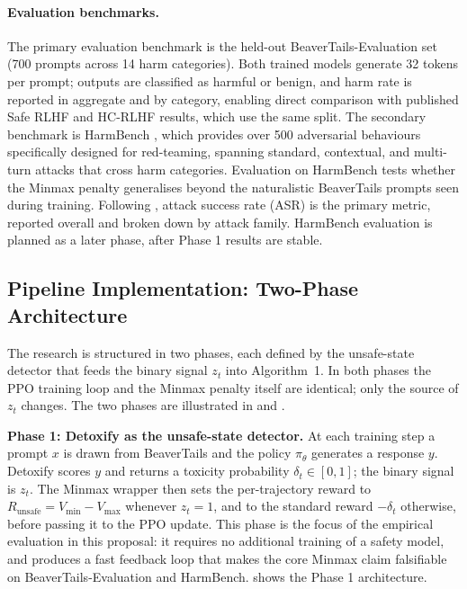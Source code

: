 \documentclass[a4paper,twoside,12pt]{report}
\newcommand{\runsafe}{R_{\text{unsafe}}}
\newcommand{\vmin}{V_{\min}}
\newcommand{\vmax}{V_{\max}}
\begin{document}
\paragraph{Evaluation benchmarks.}
The primary evaluation benchmark is the held-out BeaverTails-Evaluation set (700 prompts
across 14 harm categories). Both trained models generate 32 tokens per prompt; outputs are
classified as harmful or benign, and harm rate is reported in aggregate and by category,
enabling direct comparison with published Safe RLHF \citep{dai2024saferlhf} and HC-RLHF
\citep{chittepu2025} results, which use the same split. The secondary benchmark is
HarmBench \citep{mazeika2024}, which provides over 500 adversarial behaviours specifically
designed for red-teaming, spanning standard, contextual, and multi-turn attacks that cross
harm categories. Evaluation on HarmBench tests whether the Minmax penalty generalises
beyond the naturalistic BeaverTails prompts seen during training. Following
\citet{mazeika2024}, attack success rate (ASR) is the primary metric, reported overall and
broken down by attack family. HarmBench evaluation is planned as a later phase, after
Phase 1 results are stable.

\subsection{Pipeline Implementation: Two-Phase Architecture}
\label{sec:pipeline}

The research is structured in two phases, each defined by the unsafe-state detector that
feeds the binary signal $z_t$ into Algorithm~1. In both phases the PPO training loop and
the Minmax penalty itself are identical; only the source of $z_t$ changes. The two phases
are illustrated in  and .

\textbf{Phase 1: Detoxify as the unsafe-state detector.} At each training step a prompt
$x$ is drawn from BeaverTails and the policy $\pi_\theta$ generates a response $y$.
Detoxify \citep{hanu2020detoxify} scores $y$ and returns a toxicity probability
$\delta_t \in [0,1]$; the binary signal is $z_t$. The Minmax wrapper then sets the
per-trajectory reward to $\runsafe = \vmin - \vmax$ whenever $z_t = 1$, and to the
standard reward $-\delta_t$ otherwise, before passing it to the PPO update. This phase is
the focus of the empirical evaluation in this proposal: it requires no additional training
of a safety model, and produces a fast feedback loop that makes the core Minmax claim
falsifiable on BeaverTails-Evaluation and HarmBench.  shows the Phase 1
architecture.
\end{document}
